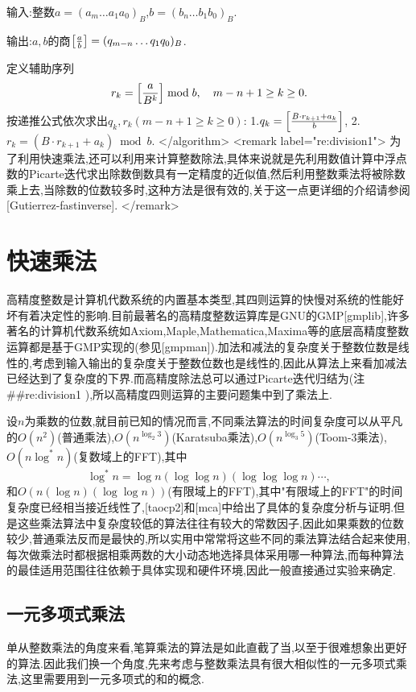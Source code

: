 \documentclass{ctexart}
\newcommand\mtcasCite[1]{[#1]}
\begin{document}
输入:整数$a=(a_m\ldots a_1a_0)_B$,$b=(b_n\ldots b_1b_0)_B$.

输出:$a,b$的商$\left[{a\over b}\right]=(q_{m-n}\ldots q_1q_0)_B$.

定义辅助序列$$r_k=\left[{a\over B^k}\right]\bmod b,\quad m-n+1\ge k\ge 0.$$
按递推公式依次求出$q_k,r_k(m-n+1\ge k\ge 0)$:
 1.$q_k=\left[{B\cdot r_{k+1}+a_k\over b}\right]$,
 2.$r_k=(B\cdot r_{k+1}+a_k)\bmod b$.
</algorithm>
<remark label="re:division1">
为了利用快速乘法,还可以利用来计算整数除法,具体来说就是先利用数值计算中浮点数的Picarte迭代求出除数倒数具有一定精度的近似值,然后利用整数乘法将被除数乘上去,当除数的位数较多时,这种方法是很有效的,关于这一点更详细的介绍请参阅\mtcasCite{Gutierrez-fastinverse}.
</remark>

\section{快速乘法}

高精度整数是计算机代数系统的内置基本类型,其四则运算的快慢对系统的性能好坏有着决定性的影响.目前最著名的高精度整数运算库是GNU的GMP\mtcasCite{gmplib},许多著名的计算机代数系统如Axiom,Maple,Mathematica,Maxima等的底层高精度整数运算都是基于GMP实现的(参见\mtcasCite{gmpman}).加法和减法的复杂度关于整数位数是线性的,考虑到输入输出的复杂度关于整数位数也是线性的,因此从算法上来看加减法已经达到了复杂度的下界.而高精度除法总可以通过Picarte迭代归结为(注##re:division1
),所以高精度四则运算的主要问题集中到了乘法上.

设$n$为乘数的位数,就目前已知的情况而言,不同乘法算法的时间复杂度可以从平凡的$O(n^2)$(普通乘法),$O(n^{\log_2{3}})$(Karatsuba乘法),$O(n^{\log_3{5}})$(Toom-3乘法),$O(n\log^*{n})$(复数域上的FFT),其中$$\log^*{n}=\log{n}(\log{\log{n}})(\log{\log{\log{n}}})\cdots,$$和$O(n(\log{n})(\log{\log{n}}))$(有限域上的FFT),其中"有限域上的FFT"的时间复杂度已经相当接近线性了,\mtcasCite{taocp2}和\mtcasCite{mca}中给出了具体的复杂度分析与证明.但是这些乘法算法中复杂度较低的算法往往有较大的常数因子,因此如果乘数的位数较少,普通乘法反而是最快的,所以实用中常常将这些不同的乘法算法结合起来使用,每次做乘法时都根据相乘两数的大小动态地选择具体采用哪一种算法,而每种算法的最佳适用范围往往依赖于具体实现和硬件环境,因此一般直接通过实验来确定.

\subsection{一元多项式乘法}

单从整数乘法的角度来看,笔算乘法的算法是如此直截了当,以至于很难想象出更好的算法.因此我们换一个角度,先来考虑与整数乘法具有很大相似性的一元多项式乘法,这里需要用到一元多项式的和的概念.
\end{document}
